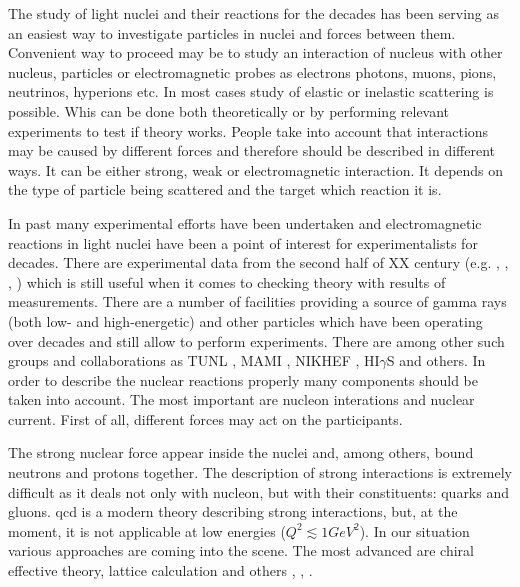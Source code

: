 The study of light nuclei and their reactions for the decades has been serving as an easiest way
to investigate particles in nuclei and forces between them. 
Convenient way to proceed may be to study an interaction of nucleus with
other nucleus, particles or electromagnetic probes
as electrons photons, muons, pions, neutrinos, hyperions etc. In most cases study of
 elastic or inelastic scattering is possible.
Whis can be done both theoretically or by 
performing relevant experiments to test if theory works.
People take into account that interactions may be caused by different forces
and therefore should be described in different ways. It can be
either strong, weak or electromagnetic interaction. It depends
on the type of particle being scattered and the target which reaction it is.

In past many experimental efforts have been undertaken and
electromagnetic reactions in light nuclei have been a point of interest for experimentalists for decades.
There are experimental data from the second half of XX century (e.g. \cite{Skopik1974}, \cite{Liuexp68}, \cite{Kose1969MeasurementsOT}, \cite{Kamae}) which is still 
useful when it comes to checking theory with results of measurements.    
There are a number of facilities providing a source of gamma rays (both low- and high-energetic)
and other particles which
have been operating over decades and still allow to perform experiments.
There are among other such groups and collaborations as TUNL \cite{TUNL}, MAMI \cite{MAMI}, 
NIKHEF \cite{NIKHEF}, HI$\gamma$S \cite{TONCHEV2005170} and others.
In order to describe the nuclear reactions properly many
components should be taken into account.
The most important are nucleon interations and nuclear current.
First of all, different forces may act on
the participants.


The strong nuclear force appear inside the nuclei and, among others, bound neutrons 
and protons together. The description of strong interactions is extremely
difficult as it deals not only with nucleon, but with their constituents: quarks
and gluons. \gls{qcd} is a modern theory
describing strong interactions, but, at the moment,
it is not applicable at low energies ($Q^2 \lesssim 1 GeV^2$).
In our situation various approaches are coming into the scene.
The most advanced are 
chiral effective theory, lattice calculation and others \cite{IOFFE2006232}, \cite{BEANElaticce}, \cite{Machleidt2011}.

